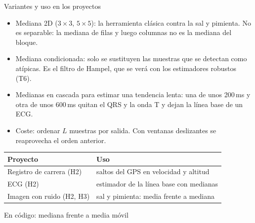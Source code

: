 \documentclass[aspectratio=169,11pt]{beamer}
\begin{document}
\begin{frame}{Variantes y uso en los proyectos}
  \footnotesize
  \begin{itemize}
    \item \alert{Mediana 2D} ($3\times3$, $5\times5$): la herramienta clásica contra la sal y pimienta. No es separable: la mediana de filas y luego columnas no es la mediana del bloque.
    \item \alert{Mediana condicionada}: solo se sustituyen las muestras que se detectan como atípicas. Es el filtro de Hampel, que se verá con los estimadores robustos (T6).
    \item \alert{Medianas en cascada} para estimar una tendencia lenta: una de unos 200\,ms y otra de unos 600\,ms quitan el QRS y la onda T y dejan la línea base de un ECG.
    \item Coste: ordenar $L$ muestras por salida. Con ventanas deslizantes se reaprovecha el orden anterior.
  \end{itemize}
  \medskip
  \begin{tabular}{@{}ll@{}}
    \toprule
    Proyecto & Uso \\ \midrule
    Registro de carrera (H2) & saltos del GPS en velocidad y altitud \\
    ECG (H2) & estimador de la línea base con medianas \\
    Imagen con ruido (H2, H3) & sal y pimienta: media frente a mediana \\
    \bottomrule
  \end{tabular}
\end{frame}

\begin{frame}{En código: mediana frente a media móvil}
\end{frame}
\end{document}
